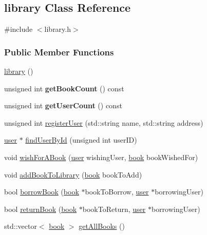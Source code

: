 \hypertarget{classlibrary}{}\subsection{library Class Reference}
\label{classlibrary}


{\ttfamily \#include $<$library.\+h$>$}

\subsubsection*{Public Member Functions}
\begin{DoxyCompactItemize}
\item 
\hyperlink{classlibrary_a2137d3edeea39929e8f111432c85bc79}{library} ()
\item 
\mbox{\label{classlibrary_acdb3a97354a845aa6c268ab31face0b4}} 
unsigned int {\bfseries get\+Book\+Count} () const
\item 
\mbox{\label{classlibrary_aa4b7a16debf823ed29e5f216d8fe8b75}} 
unsigned int {\bfseries get\+User\+Count} () const
\item 
unsigned int \hyperlink{classlibrary_aa6ec346e2b49ee2a78b1c8f5ebbf7f79}{register\+User} (std\+::string name, std\+::string address)
\item 
\hyperlink{classuser}{user} $\ast$ \hyperlink{classlibrary_a6c04fa5207a2dc59e00882cb9aa66eb1}{find\+User\+By\+Id} (unsigned int user\+ID)
\item 
void \hyperlink{classlibrary_a820b95e5a2738e923c6609ea68517286}{wish\+For\+A\+Book} (\hyperlink{classuser}{user} wishing\+User, \hyperlink{classbook}{book} book\+Wished\+For)
\item 
void \hyperlink{classlibrary_abe4fe5bfd3355630fedbefd7828ee03e}{add\+Book\+To\+Library} (\hyperlink{classbook}{book} book\+To\+Add)
\item 
bool \hyperlink{classlibrary_a72e06b28f9282c81bfb0760b0c07ffba}{borrow\+Book} (\hyperlink{classbook}{book} $\ast$book\+To\+Borrow, \hyperlink{classuser}{user} $\ast$borrowing\+User)
\item 
bool \hyperlink{classlibrary_ac96feb544ebc882b53457ccbcf8f9196}{return\+Book} (\hyperlink{classbook}{book} $\ast$book\+To\+Return, \hyperlink{classuser}{user} $\ast$borrowing\+User)
\item 
std\+::vector$<$ \hyperlink{classbook}{book} $>$ \hyperlink{classlibrary_a923bf0a858616abc8fb3f536a4d69cf6}{get\+All\+Books} ()

\end{DoxyCompactItemize}

